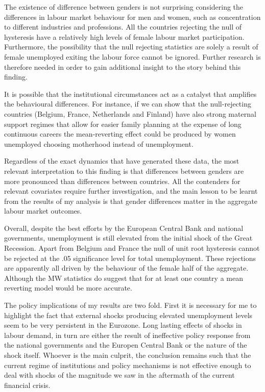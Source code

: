 \documentclass[12pt,a4paper,english]{article}
\begin{document}
The existence of difference between genders is not surprising considering the differences in labour market behaviour for men and women, such as concentration to different industries and professions. All the countries rejecting the null of hysteresis have a relatively high levels of female labour market participation. Furthermore, the possibility that the null rejecting statistics are solely a result of female unemployed exiting the labour force cannot be ignored. Further research is therefore needed in order to gain additional insight to the story behind this finding.

It is possible that the institutional circumstances act as a catalyst that amplifies the behavioural differences. For instance, if we can show that the null-rejecting countries (Belgium, France, Netherlands and Finland) have also strong maternal support regimes that allow for easier family planning at the expense of long continuous careers the mean-reverting effect could be produced by women unemployed choosing motherhood instead of unemployment. 

Regardless of the exact dynamics that have generated these data, the most relevant interpretation to this finding is that differences between genders are more pronounced than differences between countries. All the contenders for relevant covariates require further investigation, and the main lesson to be learnt from the results of my analysis is that gender differences matter in the aggregate labour market outcomes.

Overall, despite the best efforts by the European Central Bank and national governments, unemployment is still elevated from the initial shock of the Great Recession. Apart from Belgium and France the null of unit root hysteresis cannot be rejected at the .05 significance level for total unemployment. These rejections are apparently all driven by the behaviour of the female half of the aggregate. Although the MW statistics do suggest that for at least one country a mean reverting model would be more accurate.

The policy implications of my results are two fold. First it is necessary for me to highlight the fact that external shocks producing elevated unemployment levels seem to be very persistent in the Eurozone. Long lasting effects of shocks in labour demand, in turn are either the result of ineffective policy response from the national governments and the Europen Central Bank or the nature of the shock itself. Whoever is the main culprit, the conclusion remains such that the current regime of institutions and policy mechanisms is not effective enough to deal with shocks of the magnitude we saw in the aftermath of the current financial crisis.
\end{document}
